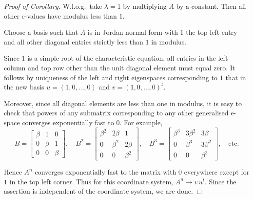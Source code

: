 \documentclass[a4paper]{amsart}
\theoremstyle{plain}
\theoremstyle{definition}
\theoremstyle{remark}
\begin{document}
\begin{proof}[Proof of Corollary] W.l.o.g.\ take $ \lambda=1 $ by multiplying $ A $ by a constant.  Then all other e-values have modulus less than $ 1 $.

Choose a basis such that  $ A $ is in Jordan normal form with  $ 1 $ the top left entry and all other diagonal entries strictly less than $ 1 $ in modulus.  

Since $ 1 $ is a simple root of the characteristic equation, all entries in  the left column and top row other than the unit diagonal element must equal zero.  It follows by uniqueness of the left and right eigenspaces corresponding to $1  $ that in the new basis $ u= (1,0,\dots, 0) $ and $ v= (1,0,\dots, 0)^t $.

Moreover, since all diagonal elements are less than one in modulus,  it is easy to check that powers of any submatrix corresponding to any other generalised e-space converges exponentially fast to $ 0 $.  For example, 
\[
B = \begin{bmatrix} \beta &1 &0 \\ 0 &\beta & 1 \\ 0 & 0 & \beta \end{bmatrix}, \quad
B^2 = \begin{bmatrix} \beta^2 &2 \beta  &1 \\ 0 &\beta^2  & 2 \beta  \\ 0 & 0 & \beta^2 \end{bmatrix}, \quad
B^3 = \begin{bmatrix} \beta^3 &3 \beta^2  &3 \beta  \\ 0 &\beta^3  & 3 \beta^2  \\ 0 & 0 & \beta^3 \end{bmatrix}, 
\quad \text{etc.}
\]

Hence $ A^n $ converges exponentially fast to the matrix with $ 0 $ everywhere except for $ 1 $ in the top left corner.  Thus for  this coordinate system, $ A^n \to v\,   u^t $.   Since the assertion is independent of the coordinate system,  we are done.
\end{proof} 


\end{document}
